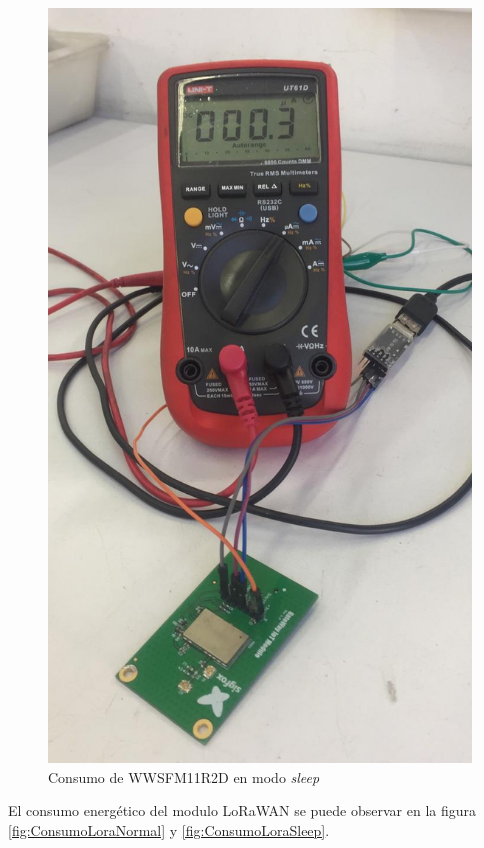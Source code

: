 \begin{figure}[H]
	\centering
	\includegraphics[scale=.15]{./Figures/ConsumoSigSleep.jpeg}
	\caption{Consumo de WWSFM11R2D en modo \textit{sleep}}
	\label{fig:ConsumoSigSleep}
\end{figure}

El consumo energético del modulo LoRaWAN se puede observar en la figura \ref{fig:ConsumoLoraNormal} y \ref{fig:ConsumoLoraSleep}. 


